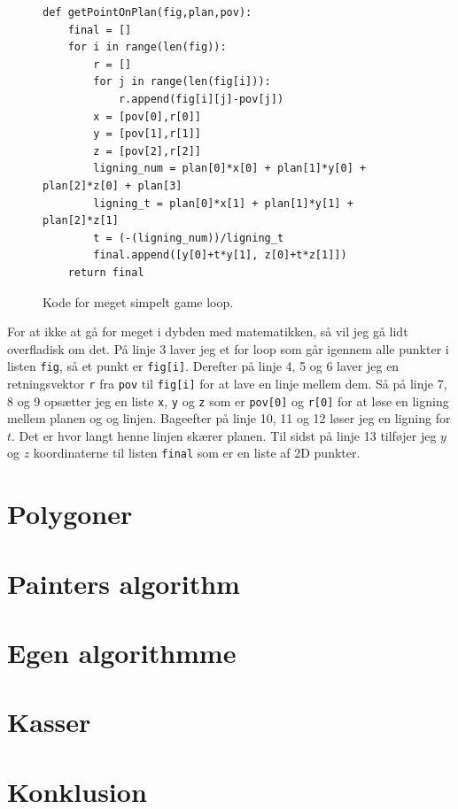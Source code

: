\documentclass{article}
\begin{document}
\begin{figure}[H]
\begin{verbatim}
def getPointOnPlan(fig,plan,pov):
    final = []
    for i in range(len(fig)):
        r = []
        for j in range(len(fig[i])):
            r.append(fig[i][j]-pov[j])
        x = [pov[0],r[0]]
        y = [pov[1],r[1]]
        z = [pov[2],r[2]]
        ligning_num = plan[0]*x[0] + plan[1]*y[0] + plan[2]*z[0] + plan[3]
        ligning_t = plan[0]*x[1] + plan[1]*y[1] + plan[2]*z[1]
        t = (-(ligning_num))/ligning_t
        final.append([y[0]+t*y[1], z[0]+t*z[1]])
    return final
\end{verbatim}
\caption{\label{fig:getPointOnPlan}Kode for meget simpelt game loop.}
\end{figure}

For at ikke at gå for meget i dybden med matematikken, så vil jeg gå lidt overfladisk om det.
På linje 3 laver jeg et for loop som går igennem alle punkter i listen \texttt{fig}, så et punkt er \texttt{fig[i]}.
Derefter på linje 4, 5 og 6 laver jeg en retningsvektor \texttt{r} fra \texttt{pov} til \texttt{fig[i]} for at lave en linje mellem dem.
Så på linje 7, 8 og 9 opsætter jeg en liste \texttt{x}, \texttt{y} og \texttt{z} som er \texttt{pov[0]} og \texttt{r[0]} for at løse en ligning mellem planen og og linjen.
Bageefter på linje 10, 11 og 12 løser jeg en ligning for $t$. Det er hvor langt henne linjen skærer planen.
Til sidst på linje 13 tilføjer jeg $y$ og $z$ koordinaterne til listen \texttt{final} som er en liste af 2D punkter.


\section{Polygoner}


\section{Painters algorithm}

\section{Egen algorithmme}

\section{Kasser}

\section{Konklusion}
\end{document}
